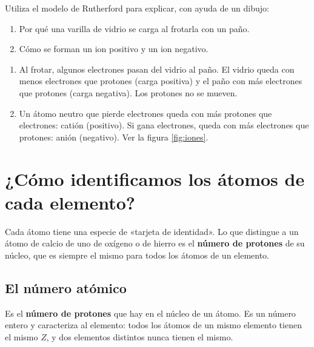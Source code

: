 \begin{exercise}
    Utiliza el modelo de Rutherford para explicar, con ayuda de un dibujo:
    \begin{enumerate}[label=\alph*)]
        \item Por qué una varilla de vidrio se carga al frotarla con un paño.
        \item Cómo se forman un ion positivo y un ion negativo.
    \end{enumerate}
    \begin{solu}
        \begin{enumerate}[label=\alph*)]
            \item Al frotar, algunos electrones pasan del vidrio al paño. El vidrio queda con menos electrones que protones (carga positiva) y el paño con más electrones que protones (carga negativa). Los protones no se mueven.
            \item Un átomo neutro que pierde electrones queda con más protones que electrones: catión (positivo). Si gana electrones, queda con más electrones que protones: anión (negativo). Ver la figura \ref{fig:iones}.
        \end{enumerate}
    \end{solu}
\end{exercise}

\section{¿Cómo identificamos los átomos de cada elemento?}

Cada átomo tiene una especie de «tarjeta de identidad». Lo que distingue a un átomo de calcio de uno de oxígeno o de hierro es el \textbf{número de protones} de su núcleo, que es siempre el mismo para todos los átomos de un elemento.

\subsection{El número atómico}

\begin{definition}
    Es el \textbf{número de protones} que hay en el núcleo de un átomo. Es un número entero y caracteriza al elemento: todos los átomos de un mismo elemento tienen el mismo \(Z\), y dos elementos distintos nunca tienen el mismo.
\end{definition}

